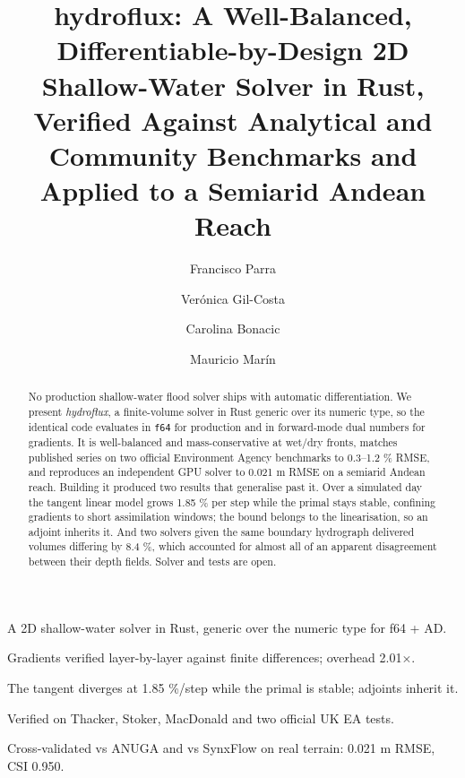 \documentclass[preprint,review,12pt,authoryear]{elsarticle}
\begin{document}
\begin{frontmatter}

\title{hydroflux: A Well-Balanced, Differentiable-by-Design 2D
Shallow-Water Solver in Rust, Verified Against Analytical and Community
Benchmarks and Applied to a Semiarid Andean Reach}

\author[usach]{Francisco Parra}

\author[unsl]{Verónica Gil-Costa}

\author[usach]{Carolina Bonacic}

\author[usach]{Mauricio Marín}



\begin{abstract}
No production shallow-water flood solver ships with automatic
differentiation. We present \emph{hydroflux},
a finite-volume solver in Rust generic over its numeric type, so the
identical code evaluates in \texttt{f64} for production and in forward-mode
dual numbers for gradients. It is well-balanced and mass-conservative at wet/dry fronts, matches
published series on two official Environment Agency benchmarks to
0.3--1.2 \% RMSE, and reproduces an independent GPU solver to 0.021 m
RMSE on a semiarid Andean reach.
Building it produced two results that generalise past it. Over a
simulated day the tangent linear model grows 1.85 \% per step while the
primal stays stable, confining gradients to short assimilation windows;
the bound belongs to the linearisation, so an adjoint inherits it. And
two solvers given the same boundary hydrograph delivered volumes
differing by 8.4 \%, which accounted for almost all of an apparent
disagreement between their depth fields. Solver and tests are open.
\end{abstract}

\begin{highlights}
\item A 2D shallow-water solver in Rust, generic over the numeric type for f64 + AD.
\item Gradients verified layer-by-layer against finite differences; overhead 2.01$\times$.
\item The tangent diverges at 1.85 \%/step while the primal is stable; adjoints inherit it.
\item Verified on Thacker, Stoker, MacDonald and two official UK EA tests.
\item Cross-validated vs ANUGA and vs SynxFlow on real terrain: 0.021 m RMSE, CSI 0.950.
\end{highlights}


\end{frontmatter}
\end{document}
